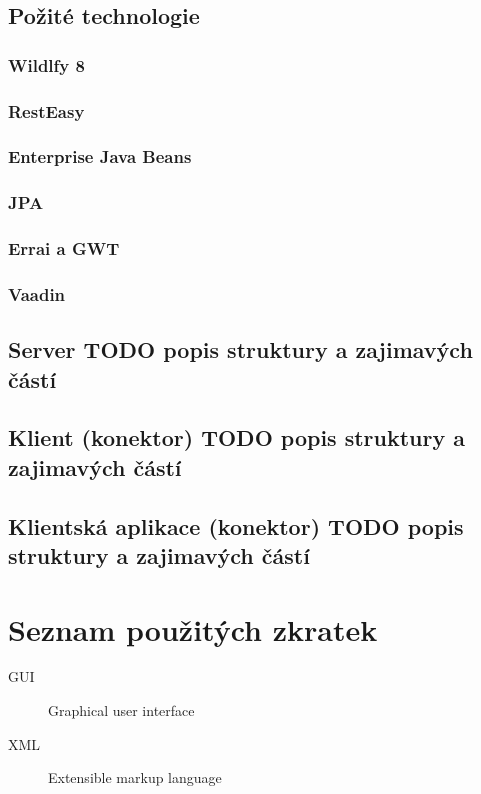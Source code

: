 \documentclass[thesis=B,czech]{FITthesis}[2012/06/26]
\begin{document}
\section{Požité technologie}
\subsection{Wildlfy 8}
\subsection{RestEasy}
\subsection{Enterprise Java Beans}
\subsection{JPA}
\subsection{Errai a GWT}
\subsection{Vaadin}

\section{Server TODO popis struktury a zajimavých částí}
\section{Klient (konektor) TODO popis struktury a zajimavých částí}
\section{Klientská aplikace (konektor) TODO popis struktury a zajimavých částí}

\begin{conclusion}
\end{conclusion}




\appendix


\chapter{Seznam použitých zkratek}
\begin{description}
	\item[GUI] Graphical user interface
	\item[XML] Extensible markup language
\end{description}
\end{document}
